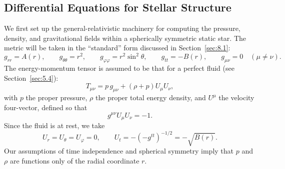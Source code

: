 
\subsection{Differential Equations for Stellar Structure}\label{sec:11.1}

We first set up the general-relativistic machinery for computing the pressure,
density, and gravitational fields within a spherically symmetric static star.
The metric will be taken in the ``standard'' form discussed in
Section~\ref{sec:8.1}:
\begin{equation}
  g_{rr}=A(r),\qquad
  g_{\theta\theta}=r^2,\qquad
  g_{\varphi\varphi}=r^2\sin^2\theta,\qquad
  g_{tt}=-B(r),\qquad
  g_{\mu\nu}=0\quad(\mu\ne\nu).
  \tag{11.1.1}\label{eq:11.1.1}
\end{equation}
The energy-momentum tensor is assumed to be that for a perfect fluid (see
Section~\ref{sec:5.4}):
\begin{equation}
  T_{\mu\nu}
  =p\,g_{\mu\nu}+(\rho+p)U_\mu U_\nu,
  \tag{11.1.2}\label{eq:11.1.2}
\end{equation}
with \(p\) the proper pressure, \(\rho\) the proper total energy density, and
\(U^\mu\) the velocity four-vector, defined so that
\begin{equation}
  g^{\mu\nu}U_\mu U_\nu=-1.
  \tag{11.1.3}\label{eq:11.1.3}
\end{equation}
Since the fluid is at rest, we take
\begin{equation}
  U_r=U_\theta=U_\varphi=0,\qquad
  U_t=-(-g^{tt})^{-1/2}=-\sqrt{B(r)}.
  \tag{11.1.4}\label{eq:11.1.4}
\end{equation}
Our assumptions of time independence and spherical symmetry imply that \(p\)
and \(\rho\) are functions only of the radial coordinate \(r\).

